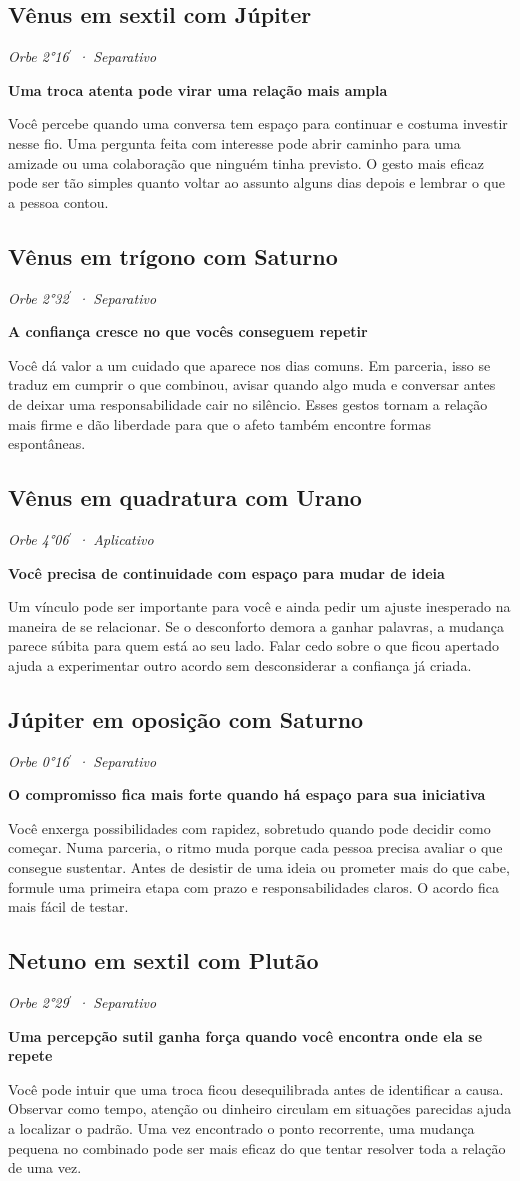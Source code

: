 \documentclass[11pt,a4paper]{article}
\newcommand{\leitura}[3]{\subsection{#1}\textit{#2}\par #3}
\newcommand{\subtituloleitura}[1]{\textbf{#1}\par\nopagebreak[4]}
\begin{document}
\leitura{Vênus em sextil com Júpiter}{Orbe 2°16\ensuremath{^{\prime}} · Separativo}{
\subtituloleitura{Uma troca atenta pode virar uma relação mais ampla}
Você percebe quando uma conversa tem espaço para continuar e costuma investir nesse fio. Uma pergunta feita com interesse pode abrir caminho para uma amizade ou uma colaboração que ninguém tinha previsto. O gesto mais eficaz pode ser tão simples quanto voltar ao assunto alguns dias depois e lembrar o que a pessoa contou.
}

\leitura{Vênus em trígono com Saturno}{Orbe 2°32\ensuremath{^{\prime}} · Separativo}{
\label{aspecto:venus-saturno}\subtituloleitura{A confiança cresce no que vocês conseguem repetir}
Você dá valor a um cuidado que aparece nos dias comuns. Em parceria, isso se traduz em cumprir o que combinou, avisar quando algo muda e conversar antes de deixar uma responsabilidade cair no silêncio. Esses gestos tornam a relação mais firme e dão liberdade para que o afeto também encontre formas espontâneas.
}

\leitura{Vênus em quadratura com Urano}{Orbe 4°06\ensuremath{^{\prime}} · Aplicativo}{
\subtituloleitura{Você precisa de continuidade com espaço para mudar de ideia}
Um vínculo pode ser importante para você e ainda pedir um ajuste inesperado na maneira de se relacionar. Se o desconforto demora a ganhar palavras, a mudança parece súbita para quem está ao seu lado. Falar cedo sobre o que ficou apertado ajuda a experimentar outro acordo sem desconsiderar a confiança já criada.
}

\leitura{Júpiter em oposição com Saturno}{Orbe 0°16\ensuremath{^{\prime}} · Separativo}{
\label{aspecto:jupiter-saturno}\subtituloleitura{O compromisso fica mais forte quando há espaço para sua iniciativa}
Você enxerga possibilidades com rapidez, sobretudo quando pode decidir como começar. Numa parceria, o ritmo muda porque cada pessoa precisa avaliar o que consegue sustentar. Antes de desistir de uma ideia ou prometer mais do que cabe, formule uma primeira etapa com prazo e responsabilidades claros. O acordo fica mais fácil de testar.
}

\leitura{Netuno em sextil com Plutão}{Orbe 2°29\ensuremath{^{\prime}} · Separativo}{
\subtituloleitura{Uma percepção sutil ganha força quando você encontra onde ela se repete}
Você pode intuir que uma troca ficou desequilibrada antes de identificar a causa. Observar como tempo, atenção ou dinheiro circulam em situações parecidas ajuda a localizar o padrão. Uma vez encontrado o ponto recorrente, uma mudança pequena no combinado pode ser mais eficaz do que tentar resolver toda a relação de uma vez.
}
\end{document}
